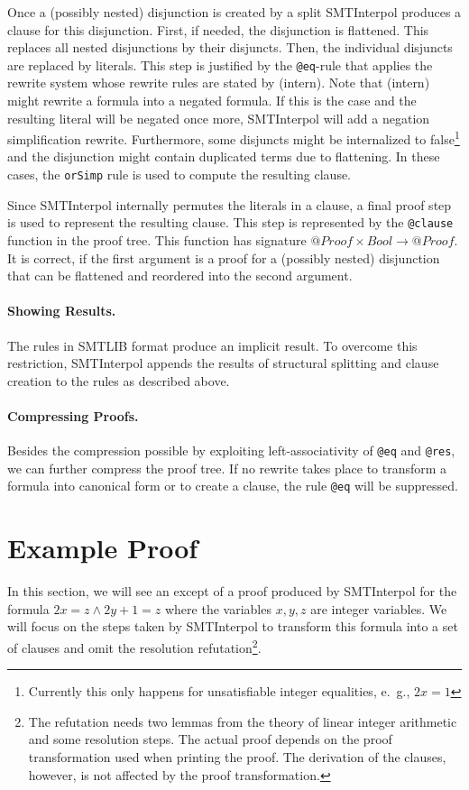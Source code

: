 \documentclass[a4paper]{article}
\newcommand\si{SMTInterpol\xspace}
\begin{document}
Once a (possibly nested) disjunction is created by a split \si produces a
clause for this disjunction.  First, if needed, the disjunction is flattened.
This replaces all nested disjunctions by their disjuncts.  Then, the
individual disjuncts are replaced by literals.  This step is justified by the
\verb+@eq+-rule that applies the rewrite system whose rewrite rules are stated
by (intern).   Note that (intern) might rewrite a formula
into a negated formula.  If this is the case and the resulting literal will
be negated once more, \si will add a negation simplification rewrite.
Furthermore, some disjuncts might be internalized to false\footnote{Currently
  this only happens for unsatisfiable integer equalities, e.~g., $2x=1$} and
the disjunction might contain duplicated terms due to flattening.  In these
cases, the \verb+orSimp+ rule is used to compute the resulting clause.

Since \si internally permutes the literals in a clause, a final proof step is
used to represent the resulting clause.
This step is represented by the \verb+@clause+
function in the proof tree.  This function has
signature $@Proof\times Bool\rightarrow@Proof$.
It is correct, if the first argument is a proof for a (possibly nested)
disjunction that can be flattened and reordered into the second argument.

\paragraph{Showing Results.}  The rules in SMTLIB format produce an implicit
result.  To overcome this restriction, \si appends the results of structural
splitting and clause creation to the rules as described above.

\paragraph{Compressing Proofs.}  Besides the compression possible by
exploiting left-associativity of \verb+@eq+ and \verb+@res+, we can further
compress the proof tree.  If no rewrite takes place to transform a formula
into canonical form or to create a clause, the rule \verb+@eq+ will be
suppressed.

\section{Example Proof}
In this section, we will see an except of a proof produced by \si for the
formula $2x=z \land 2y + 1 = z$ where the variables $x,y,z$ are integer
variables.  We will focus on the steps taken by \si to transform this formula
into a set of clauses and omit the resolution refutation\footnote{The
  refutation needs two lemmas from the theory of linear integer arithmetic and
  some resolution steps.  The actual proof depends on the proof transformation
  used when printing the proof.  The derivation of the clauses, however, is
  not affected by the proof transformation.}.
\end{document}
